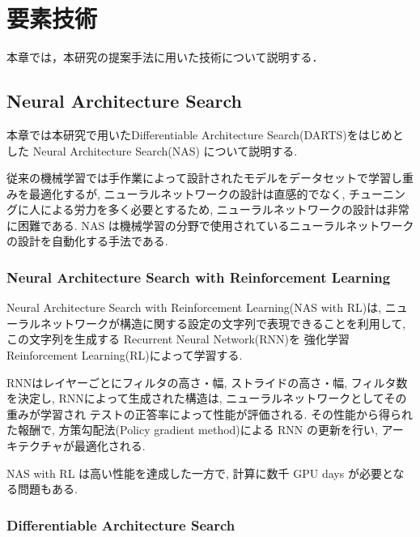 \newpage
\changeindent{0cm}
\section{要素技術}
\label{sec:tech}
\changeindent{2cm}


本章では，本研究の提案手法に用いた技術について説明する．

\changeindent{0cm}
\subsection{Neural Architecture Search}
\changeindent{2cm}
\label{sec:02_deep}
本章では本研究で用いたDifferentiable Architecture Search(DARTS)をはじめとした
Neural Architecture Search(NAS) について説明する.

従来の機械学習では手作業によって設計されたモデルをデータセットで学習し重みを最適化するが,
ニューラルネットワークの設計は直感的でなく,
チューニングに人による労力を多く必要とするため,
ニューラルネットワークの設計は非常に困難である.
NAS は機械学習の分野で使用されているニューラルネットワークの設計を自動化する手法である.


\changeindent{0cm}
\subsubsection{Neural Architecture Search with Reinforcement Learning}
\changeindent{2cm}
\label{sec:02_nas}
Neural Architecture Search with Reinforcement Learning(NAS with RL)\cite{DBLP:journals/corr/ZophL16}は,
ニューラルネットワークが構造に関する設定の文字列で表現できることを利用して,
この文字列を生成する Recurrent Neural Network(RNN)\cite{mikolov2010recurrent}を
強化学習 Reinforcement Learning(RL)\cite{sutton2018reinforcement}によって学習する.

RNNはレイヤーごとにフィルタの高さ・幅, ストライドの高さ・幅, フィルタ数を決定し,
RNNによって生成された構造は, ニューラルネットワークとしてその重みが学習され
テストの正答率によって性能が評価される.
その性能から得られた報酬で, 方策勾配法(Policy gradient method)\cite{sutton1999policy}による RNN の更新を行い,
アーキテクチャが最適化される.

NAS with RL は高い性能を達成した一方で, 計算に数千 GPU days が必要となる問題もある.

\changeindent{0cm}
\subsubsection{Differentiable Architecture Search}
\changeindent{2cm}
\label{sec:02_darts}


